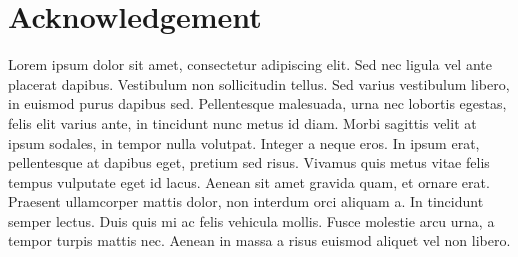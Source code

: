 \chapter*{Acknowledgement}
\thispagestyle{empty} %
Lorem ipsum dolor sit amet, consectetur adipiscing elit. Sed nec ligula vel
ante placerat dapibus. Vestibulum non sollicitudin tellus. Sed varius
vestibulum libero, in euismod purus dapibus sed. Pellentesque malesuada,
urna nec lobortis egestas, felis elit varius ante, in tincidunt nunc metus
id diam. Morbi sagittis velit at ipsum sodales, in tempor nulla volutpat.
Integer a neque eros. In ipsum erat, pellentesque at dapibus eget, pretium
sed risus. Vivamus quis metus vitae felis tempus vulputate eget id lacus.
Aenean sit amet gravida quam, et ornare erat. Praesent ullamcorper mattis
dolor, non interdum orci aliquam a. In tincidunt semper lectus. Duis quis
mi ac felis vehicula mollis. Fusce molestie arcu urna, a tempor turpis
mattis nec. Aenean in massa a risus euismod aliquet vel non libero.
